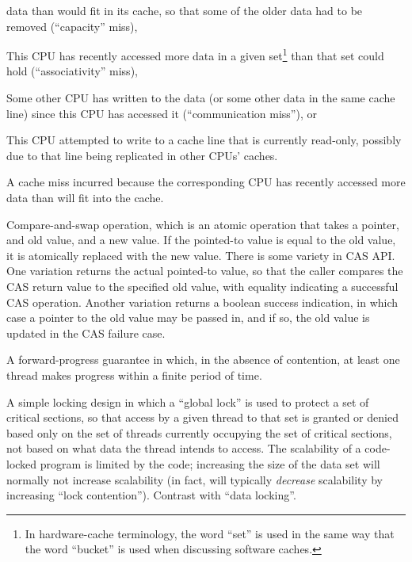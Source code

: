 \begin{description}
\begin{enumerate*}[(1)]
	data than would fit in its cache, so that some of the older
	data had to be removed (``capacity'' miss),
	\item This CPU
	has recently accessed more data in a given set\footnote{
		In hardware-cache terminology, the word ``set''
		is used in the same way that the word ``bucket''
		is used when discussing software caches.}
	than that set could hold (``associativity'' miss),
	\item Some other CPU has written to the data (or some other
	data in the same cache line) since this CPU has accessed it
	(``communication miss''), or
	\item This CPU attempted to write to a cache line that is
	currently read-only, possibly due to that line being replicated
	in other CPUs' caches.
	\end{enumerate*}
\item[\IXGalth{Capacity Miss}{capacity}{cache miss}:]
	A cache miss incurred because the corresponding CPU has recently
	accessed more data than will fit into the cache.
\item[CAS:]
	Compare-and-swap operation, which is an atomic operation that
	takes a pointer, and old value, and a new value.
	If the pointed-to value is equal to the old value, it is atomically
	replaced with the new value.
	There is some variety in CAS API\@.
	One variation returns the actual pointed-to value, so that the
	caller compares the CAS return value to the specified old value,
	with equality indicating a successful CAS operation.
	Another variation returns a boolean success indication, in which
	case a pointer to the old value may be passed in, and if so,
	the old value is updated in the CAS failure case.
\item[\IXG{Clash Free}:]
	A forward-progress guarantee in which, in the absence of
	contention, at least one thread makes progress within a finite
	period of time.
\item[\IXGalth{Code Locking}{code}{locking}:]
	A simple locking design in which a ``global lock'' is used to protect
	a set of critical sections, so that access by a given thread
	to that set is
	granted or denied based only on the set of threads currently
	occupying the set of critical sections, not based on what
	data the thread intends to access.
	The scalability of a code-locked program is limited by the code;
	increasing the size of the data set will normally not increase
	scalability (in fact, will typically \emph{decrease} scalability
	by increasing ``lock contention'').
	Contrast with ``data locking''.

\end{description}
